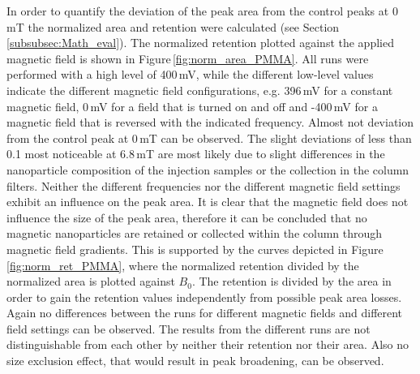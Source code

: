 In order to quantify the deviation of the peak area from the control peaks at 0\,mT the normalized area and retention were calculated (see Section\,\ref{subsubsec:Math_eval}). The normalized retention plotted against the applied magnetic field is shown in Figure\,\ref{fig:norm_area_PMMA}. All runs were performed with a high level of 400\,mV, while the different low-level values indicate the different magnetic field configurations, e.g. 396\,mV for a constant magnetic field, 0\,mV for a field that is turned on and off and -400\,mV for a magnetic field that is reversed with the indicated frequency. Almost not deviation from the control peak at 0\,mT can be observed. The slight deviations of less than 0.1 most noticeable at 6.8\,mT are most likely due to slight differences in the nanoparticle composition of the injection samples or the collection in the column filters. Neither the different frequencies nor the different magnetic field settings exhibit an influence on the peak area. It is clear that the magnetic field does not influence the size of the peak area, therefore it can be concluded that no magnetic nanoparticles are retained or collected within the column through magnetic field gradients. This is supported by the curves depicted in Figure\,\ref{fig:norm_ret_PMMA}, where the normalized retention divided by the normalized area is plotted against $B_{0}$. The retention is divided by the area in order to gain the retention values independently from possible peak area losses. Again no differences between the runs for different magnetic fields and different field settings can be observed. The results from the different runs are not distinguishable from each other by neither their retention nor their area. Also no size exclusion effect, that would result in peak broadening, can be observed.


